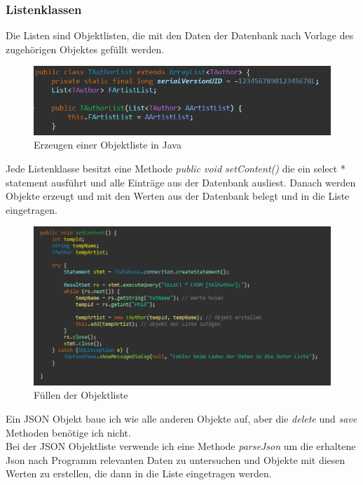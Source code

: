 \subsubsection{Listenklassen}
Die Listen sind Objektlisten, die mit den Daten der Datenbank nach Vorlage des zugehörigen Objektes gefüllt werden.\\
\begin{figure}[h]
\begin{center}
\includegraphics[width=15cm]{img/listklasse.png}
\caption{Erzeugen einer Objektliste in Java}
\label{listklasse}
\end{center}
\end{figure}
Jede Listenklasse besitzt eine Methode \textit{public void setContent() {}} die ein select * statement ausführt und alle Einträge aus der Datenbank ausliest. Danach werden Objekte erzeugt und mit den Werten aus der Datenbank belegt und in die Liste eingetragen.\\
\begin{figure}[h]
\begin{center}
\includegraphics[width=15cm]{img/setcontent.png}
\caption{Füllen der Objektliste}
\label{listklasse}
\end{center}
\end{figure}
\newpage
Ein JSON Objekt baue ich wie alle anderen Objekte auf, aber die \textit{delete} und \textit{save} Methoden benötige ich nicht.\\
Bei der JSON Objektliste verwende ich eine Methode \textit{parseJson} um die erhaltene Json nach Programm relevanten Daten zu untersuchen und Objekte mit diesen Werten zu erstellen, die dann in die Liste eingetragen werden.
